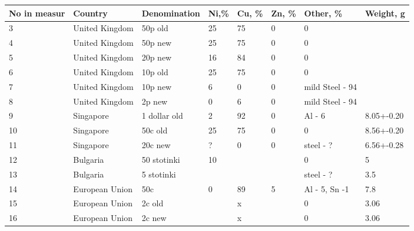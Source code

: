 \documentclass[11pt,a4paper,twoside,onecolumn]{article}
\begin{document}
{\begin{table}[htbp]
    \centering
    \begin{tabular}{@{}llllllll@{}}
    \toprule
    No in   measur & Country        & Denomination   & Ni,\%    & Cu, \%   & Zn, \% & Other, \%            & Weight, g  \\ \midrule
    3              & United Kingdom & 50p old        & 25       & 75       & 0      & 0                    &            \\
    4              & United Kingdom & 50p new        & 25       & 75       & 0      & 0                    &            \\
    5              & United Kingdom & 20p new        & 16       & 84       & 0      & 0                    &            \\
    6              & United Kingdom & 10p old        & 25       & 75       & 0      & 0                    &            \\
    7              & United Kingdom & 10p new        & 6        & 0        & 0      & mild Steel - 94      &            \\
    8              & United Kingdom & 2p new         & 0        & 6        & 0      & mild Steel - 94      &            \\
    9              & Singapore      & 1 dollar old   & 2        & 92       & 0      & Al - 6               & 8.05+-0.20 \\
    10             & Singapore      & 50c old        & 25       & 75       & 0      & 0                    & 8.56+-0.20 \\
    11             & Singapore      & 20c new        & ?        & 0        & 0      & steel - ?            & 6.56+-0.28 \\
    12             & Bulgaria       & 50 stotinki    & 10       &          &        & 0                    & 5          \\
    13             & Bulgaria       & 5 stotinki     &          &          &        & steel - ?            & 3.5        \\
    14             & European Union & 50c            & 0        & 89       & 5      & Al - 5, Sn -1        & 7.8        \\
    15             & European Union & 2c old         &          & x        &        & 0                    & 3.06       \\
    16             & European Union & 2c new         &          & x        &        & 0                    & 3.06       \\

\end{tabular}
\end{table}}
\end{document}
